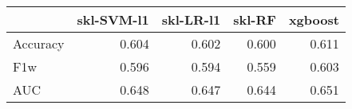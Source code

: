 \begin{tabular}{lrrrr}
\toprule
{} &  skl-SVM-l1 &  skl-LR-l1 &  skl-RF &  xgboost \\
\midrule
Accuracy &       0.604 &      0.602 &   0.600 &    0.611 \\
F1w      &       0.596 &      0.594 &   0.559 &    0.603 \\
AUC      &       0.648 &      0.647 &   0.644 &    0.651 \\
\bottomrule
\end{tabular}
